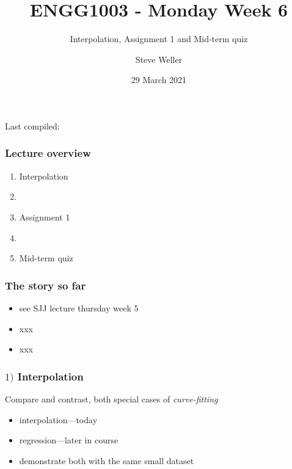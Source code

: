 \documentclass[english,14pt]{beamer}
\title{ENGG1003 - Monday Week 6}
\subtitle{Interpolation, Assignment 1 and Mid-term quiz}
\author{Steve Weller}
\institute{University of Newcastle}
\date{29 March 2021}
\newcommand\red[1]{{\color{red} #1}}
\begin{document}
\begin{flushleft}
{\scriptsize Last compiled:~\DTMnow}
\vspace*{-5mm}
\end{flushleft}
\framebreak


\begin{frame}[fragile]

\frametitle{Lecture overview}
\begin{enumerate}
	\item Interpolation
	\item[]
	
	\item Assignment 1
	
	\item[]
	
	\item Mid-term quiz

\end{enumerate}

\end{frame}


\begin{frame}[fragile]

\frametitle{The story so far}

\begin{itemize}
	\item see SJJ lecture thursday week 5
	\item xxx
	\item xxx
\end{itemize}

\end{frame}


\begin{frame}[fragile]

\frametitle{$1)$ Interpolation}

Compare and contrast, both special cases of \red{\emph{curve-fitting}}

\begin{itemize}
	\item interpolation---today
	\item regression---later in course
	\item demonstrate both with the same small dataset
\end{itemize}

\end{frame}
\end{document}
